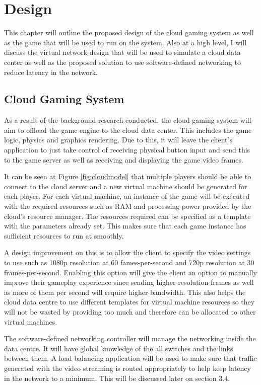\chapter{Design}
\label{chapter3}
This chapter will outline the proposed design of the cloud gaming system as well as the game that will be used to run on the system. Also at a high level, I will discuss the virtual network design that will be used to simulate a cloud data center as well as the proposed solution to use software-defined networking to reduce latency in the network.

\section{Cloud Gaming System}
As a result of the background research conducted, the cloud gaming system will aim to offload the game engine to the cloud data center. This includes the game logic, physics and graphics rendering. Due to this, it will leave the client's application to just take control of receiving physical button input and send this to the game server as well as receiving and displaying the game video frames.
\newline
\par
It can be seen at Figure \ref{fig:cloudmodel} that multiple players should be able to connect to the cloud server and a new virtual machine should be generated for each player. For each virtual machine, an instance of the game will be executed with the required resources such as RAM and processing power provided by the cloud's resource manager. The resources required can be specified as a template with the parameters already set. This makes sure that each game instance has sufficient resources to run at smoothly.
\newline
\par
A design improvement on this is to allow the client to specify the video settings to use such as 1080p resolution at 60 fames-per-second and 720p resolution at 30 frames-per-second. Enabling this option will give the client an option to manually improve their gameplay experience since sending higher resolution frames as well as more of them per second will require higher bandwidth. This also helps the cloud data centre to use different templates for virtual machine resources so they will not be wasted by providing too much and therefore can be allocated to other virtual machines.
\newline
\par
The software-defined networking controller will manage the networking inside the data centre. It will have global knowledge of the all switches and the links between them. A load balancing application will be used to make sure that traffic generated with the video streaming is routed appropriately to help keep latency in the network to a minimum. This will be discussed later on section 3.4.
